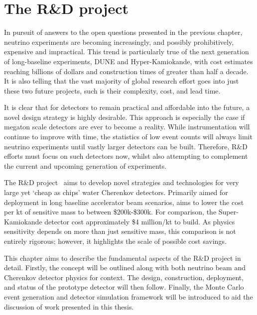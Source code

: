 \chapter{The \chips R\&D project} %
\label{chap:chips}

In pursuit of answers to the open questions presented in the previous chapter, neutrino
experiments are becoming increasingly, and possibly prohibitively, expensive and impractical. This
trend is particularly true of the next generation of long-baseline experiments, DUNE and
Hyper-Kamiokande, with cost estimates reaching billions of dollars and construction times of
greater than half a decade. It is also telling that the vast majority of global research effort
goes into just these two future projects, such is their complexity, cost, and lead time.

It is clear that for detectors to remain practical and affordable into the future, a novel design
strategy is highly desirable. This approach is especially the case if megaton scale detectors are
ever to become a reality. While instrumentation will continue to improve with time, the statistics
of low event counts will always limit neutrino experiments until vastly larger detectors can be
built. Therefore, R\&D efforts must focus on such detectors now, whilst also attempting to
complement the current and upcoming generation of experiments.

The \chips R\&D project~\cite{adamson2013} aims to develop novel strategies and technologies for
very large yet `cheap as chips' water Cherenkov detectors. Primarily aimed for deployment in long
baseline accelerator beam scenarios, \chips aims to lower the cost per kt of sensitive mass to
between \$200k-\$300k. For comparison, the Super-Kamiokande detector cost approximately \$4
million/kt to build. As physics sensitivity depends on more than just sensitive mass, this
comparison is not entirely rigorous; however, it highlights the scale of possible cost savings.

This chapter aims to describe the fundamental aspects of the \chips R\&D project in detail.
Firstly, the \chips concept will be outlined along with both neutrino beam and Cherenkov detector
physics for context. The design, construction, deployment, and status of the \chipsfive prototype
detector will then follow. Finally, the Monte Carlo event generation and detector simulation
framework will be introduced to aid the discussion of work presented in this thesis.

